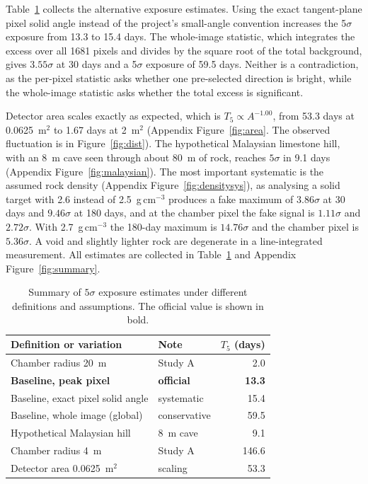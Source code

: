 \documentclass{article}
\begin{document}
Table~\ref{tab:summary} collects the alternative exposure estimates. Using the
exact tangent-plane pixel solid angle instead of the project's small-angle
convention increases the 5$\sigma$ exposure from 13.3 to 15.4 days. The
whole-image statistic, which integrates the excess over all 1681 pixels and
divides by the square root of the total background, gives $3.55\sigma$ at
30 days and a 5$\sigma$ exposure of 59.5 days. Neither is a contradiction, as the
per-pixel statistic asks whether one pre-selected direction is bright, while
the whole-image statistic asks whether the total excess is significant.

Detector area scales exactly as expected, which is $T_5\propto A^{-1.00}$, from
53.3 days at 0.0625~m$^2$ to 1.67 days at 2~m$^2$ (Appendix
Figure~\ref{fig:area}. The observed fluctuation is in
Figure~\ref{fig:dist}). The hypothetical Malaysian limestone hill, with an 8~m
cave seen through about 80~m of rock, reaches $5\sigma$ in 9.1 days (Appendix
Figure~\ref{fig:malaysian}). The most important systematic is the assumed rock
density (Appendix Figure~\ref{fig:densitysys}), as analysing a solid target with
2.6 instead of 2.5~g\,cm$^{-3}$ produces a fake maximum of $3.86\sigma$ at
30 days and $9.46\sigma$ at 180 days, and at the chamber pixel the fake signal is
$1.11\sigma$ and $2.72\sigma$. With 2.7~g\,cm$^{-3}$ the 180-day maximum is
$14.76\sigma$ and the chamber pixel is $5.36\sigma$. A void and slightly
lighter rock are degenerate in a line-integrated measurement. All estimates are
collected in Table~\ref{tab:summary} and Appendix Figure~\ref{fig:summary}.

\begin{table}[t]
\centering
\caption{Summary of $5\sigma$ exposure estimates under different definitions
and assumptions. The official value is shown in bold.}
\label{tab:summary}
\small
\begin{tabular}{@{}llr@{}}
\toprule
Definition or variation & Note & $T_5$ (days) \\
\midrule
Chamber radius 20~m & Study A & 2.0 \\
\textbf{Baseline, peak pixel} & \textbf{official} & \textbf{13.3} \\
Baseline, exact pixel solid angle & systematic & 15.4 \\
Baseline, whole image (global) & conservative & 59.5 \\
Hypothetical Malaysian hill & 8~m cave & 9.1 \\
Chamber radius 4~m & Study A & 146.6 \\
Detector area 0.0625~m$^2$ & scaling & 53.3 \\
\bottomrule
\end{tabular}
\end{table}
\end{document}

